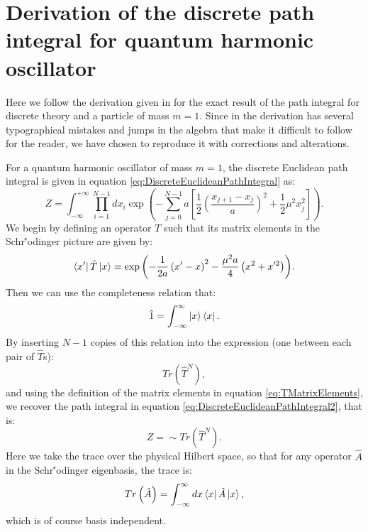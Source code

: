 \documentclass[12pt]{article}
\begin{document}
    \section{Derivation of the discrete path integral for quantum harmonic oscillator}
        \label{ap:DiscretePathIntegralDerivation}
        Here we follow the derivation given in \cite{creutz_freedman_1981} for the exact result of the path integral for discrete theory and a particle of mass $m=1$. Since in \cite{creutz_freedman_1981} the derivation has several typographical mistakes and jumps in the algebra that make it difficult to follow for the reader, we have chosen to reproduce it with corrections and alterations.

        For a quantum harmonic oscillator of mass $m=1$, the discrete Euclidean path integral is given in equation \ref{eq:DiscreteEuclideanPathIntegral} as:
        \begin{equation}
            \label{eq:DiscreteEuclideanPathIntegral2}
            Z = \int^{+\infty}_{-\infty}\prod_{i=1}^{N-1}dx_i \exp{\left(-\sum^{N-1}_{j=0} a \left[\frac{1}{2}\left(\frac{x_{j+1}-x_j}{a}\right)^2+\frac{1}{2}\mu^2x_{j}^2\right]\right)}.
        \end{equation}
        We begin by defining an operator $T$ such that its matrix elements in the Schr{\''o}dinger picture are given by:
        \begin{equation}
            \label{eq:TMatrixElements}
            \bra{x'}\hat{T}\ket{x} = \exp{\left(-\frac{1}{2a}\left(x'-x\right)^2-\frac{\mu^2a}{4}\left(x^2+x'^2\right)\right)}.
        \end{equation}
        Then we can use the completeness relation that:
        \begin{equation}
            \label{eq:CompletenessRelation}
            \hat{1} = \int_{-\infty}^{\infty}\ket{x}\bra{x}.
        \end{equation}
        By inserting $N-1$ copies of this relation into the expression (one between each pair of $\hat{T}$s):
        \begin{equation}
            \label{eq:TraceT}
            Tr\left(\hat{T}^{N}\right),
        \end{equation}
        and using the definition of the matrix elements in equation \ref{eq:TMatrixElements}, we recover the path integral in equation \ref{eq:DiscreteEuclideanPathIntegral2}, that is:
        \begin{equation}
            \label{eq:PathIntegralAsTrace}
            Z = \sim Tr\left(\hat{T}^N\right).
        \end{equation}
        Here we take the trace over the physical Hilbert space, so that for any operator $\hat{A}$ in the Schr{\''o}dinger eigenbasis, the trace is:
        \begin{equation}
            \label{eq:Trace}
            Tr\left(\hat{A}\right) = \int_{-\infty}^{\infty}dx\bra{x}\hat{A}\ket{x},
        \end{equation}
        which is of course basis independent.
\end{document}
